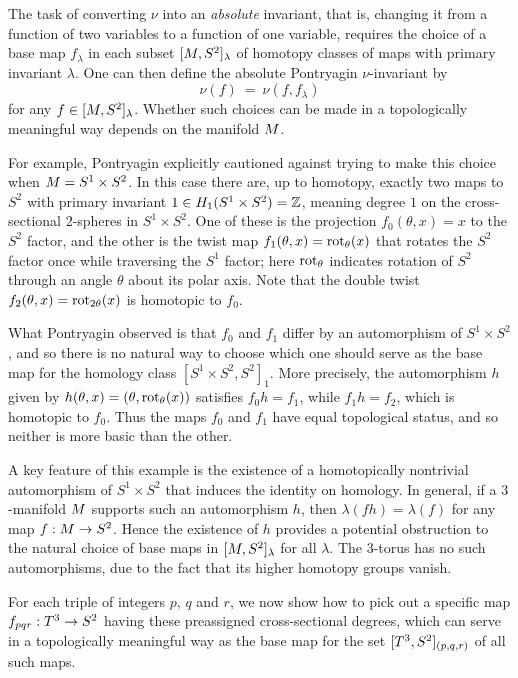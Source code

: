 The task of converting $\nu$ into an {\it absolute} invariant, that is, changing it from a function of two variables to a function of one variable, requires the choice of a {\itb base map} $f_\lambda$ in each subset $[M,S^2]_{\lambda}$ of homotopy classes of maps with primary invariant $\lambda$.  One can then define the {\itb\boldmath absolute Pontryagin $\nu$-invariant} by
$$
\nu(f) \ = \ \nu(f,f_\lambda)
$$
for any $f\in[M,S^2]_\lambda$.  Whether such choices can be made in a topologically meaningful way depends on the manifold $M$. 
 
For example, Pontryagin \cite[page 356]{Pontryagin41} explicitly cautioned against trying to make this choice when $M=S^1\times S^2$.  In this case there are, up to homotopy, exactly two maps to $S^2$ with primary invariant $1\in H_1(S^1\times S^2) = \mathbb Z$, meaning degree $1$ on the cross-sectional $2$-spheres in $S^1\times S^2$.  One of these is the projection $f_0(\theta,x)  =  x$ to the $S^2$ factor,  and the other is the twist map $f_1(\theta,x)  =  \mathrm{rot}_\theta(x)$ that rotates the $S^2$ factor once while traversing the $S^1$ factor; here $\mathrm{rot}_\theta$  indicates rotation of  $S^2$ through an angle $\theta$ about its polar axis.  Note that the double twist $f_2(\theta,x)  =  \mathrm{rot}_{2\theta}(x)$ is homotopic to $f_0$.   

What Pontryagin observed is that $f_0$ and $f_1$ differ by an automorphism of $S^1\times S^2$, and so there is no natural way to choose which one should serve as the base map for the homology class $[S^1\times S^2,S^2]_1$.  More precisely, the automorphism $h$ given by $h(\theta,x)  =  (\theta,\mathrm{rot}_\theta(x))$ satisfies $f_0h=f_1$, while $f_1h=f_2$, which is homotopic to $f_0$.  Thus the maps $f_0$ and $f_1$ have equal topological status, and so neither is more basic than the other.

A key feature of this example is the existence of a homotopically nontrivial automorphism of $S^1\times S^2$ that induces the identity on homology.  In general, if a $3$-manifold $M$ supports such an automorphism $h$, then $\lambda(fh) = \lambda(f)$ for any map $f:M\to S^2$.   Hence the existence of $h$ provides a potential obstruction to the natural choice of base maps in $[M,S^2]_\lambda$ for all $\lambda$.  The $3$-torus has no such automorphisms, due to the fact that its higher homotopy groups vanish.   

For each triple of integers $p$, $q$  and $r$,  we now show how to pick out a specific map $f_{pqr}:T^3\to S^2$ having these preassigned cross-sectional degrees, which can serve in a topologically meaningful way as the base map for the set $[T^3,S^2]_{(p,q,r)}$ of all such maps.   

